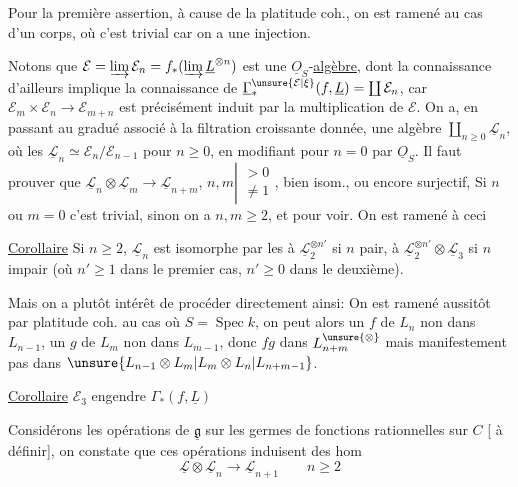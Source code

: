 Pour la première assertion, à cause de la platitude coh., on est ramené au cas d'un corps, où c'est trivial car on a une injection.

Notons que $\mathcal E=\varinjlim\mathcal E_n=f_*(\varinjlim\underline L^{\otimes n})$ est une $\underline O_S$-\uline{algèbre}, dont la connaissance d'ailleurs implique la connaissance de $\underline\Gamma_*^{\unsure{\mathcal E|\xi}}(f,\underline L)=\coprod\mathcal E_n$, car $\mathcal E_m\times\mathcal E_n\longrightarrow\mathcal E_{m+n}$ est précisément induit par la multiplication de $\mathcal E$. On a, en passant au gradué associé à la filtration croissante donnée, une algèbre $\coprod_{n\geq0}\underline{\mathcal L}_n$, où les $\underline{\mathcal L}_n\simeq\mathcal E_n/\mathcal E_{n-1}$ pour $n\geq0$, en modifiant pour $n=0$ par $\underline O_S$. Il faut prouver que $\underline{\mathcal L}_n\otimes\underline{\mathcal L}_m\longrightarrow\underline{\mathcal L}_{n+m}$, $n,m\left|\begin{smallmatrix}>0\\\ne1\end{smallmatrix}\right.$,   bien isom., ou encore surjectif,  Si $n$ ou $m=0$  c'est trivial, sinon on a $n,m\geq2$, et pour voir.
On est ramené à ceci

\uline{Corollaire} Si $n\geq2$, $\underline{\mathcal L}_n$ est isomorphe par les  à $\underline{\mathcal L}_2^{\otimes n'}$ si $n$ pair, à $\underline{\mathcal L}_2^{\otimes n'}\otimes\underline{\mathcal L}_3$ si $n$ impair (où $n'\geq1$ dans le premier cas, $n'\geq0$ dans le deuxième).

Mais on a plutôt intérêt de procéder directement ainsi: On est ramené aussitôt par platitude coh. au cas où $S=\operatorname{Spec} k$, on peut alors un  $f$ de $L_n$ non dans $L_{n-1}$, un $g$ de $L_m$ non dans $L_{m-1}$, donc $fg$  dans $L_{n+m}^{\unsure{\otimes}}$ mais manifestement pas dans $\unsure{L_{n-1}\otimes L_m|L_m\otimes L_n|L_{n+m-1}}$.

\uline{Corollaire} $\mathcal E_3$ engendre $\Gamma_*(f,\underline L)$

Considérons les opérations de $\underline{\mathfrak g}$ sur les germes de fonctions rationnelles sur $C$ [ à définir], on constate que  ces opérations induisent des hom
\[
\underline{\mathcal L}\otimes\underline{\mathcal L}_n\longrightarrow\underline{\mathcal L}_{n+1}\qquad n\geq2
\]

